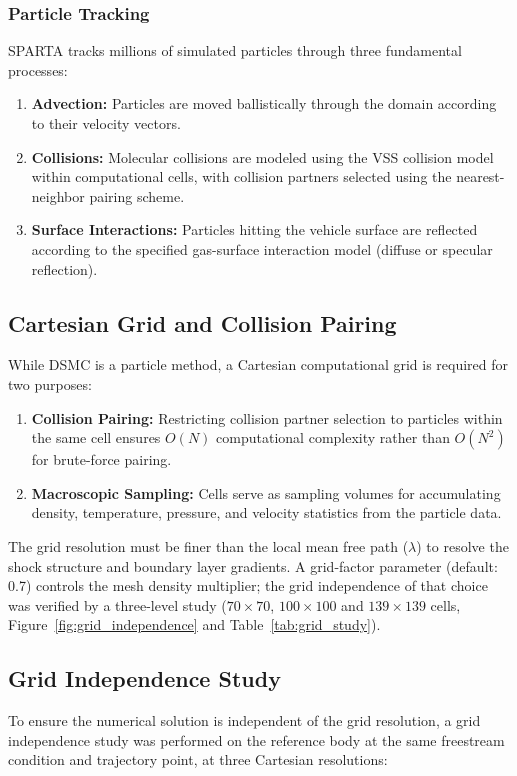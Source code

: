 \subsubsection*{Particle Tracking}
SPARTA tracks millions of simulated particles through three fundamental processes:
\begin{enumerate}
    \item \textbf{Advection:} Particles are moved ballistically through the domain according to their velocity vectors.
    \item \textbf{Collisions:} Molecular collisions are modeled using the VSS collision model within computational cells, with collision partners selected using the nearest-neighbor pairing scheme.
    \item \textbf{Surface Interactions:} Particles hitting the vehicle surface are reflected according to the specified gas-surface interaction model (diffuse or specular reflection).
\end{enumerate}

\subsection{Cartesian Grid and Collision Pairing}
While DSMC is a particle method, a Cartesian computational grid is required for two purposes:
\begin{enumerate}
    \item \textbf{Collision Pairing:} Restricting collision partner selection to particles within the same cell ensures $O(N)$ computational complexity rather than $O(N^2)$ for brute-force pairing.
    \item \textbf{Macroscopic Sampling:} Cells serve as sampling volumes for accumulating density, temperature, pressure, and velocity statistics from the particle data.
\end{enumerate}

The grid resolution must be finer than the local mean free path ($\lambda$) to resolve the shock structure and boundary layer gradients. A grid-factor parameter (default: 0.7) controls the mesh density multiplier; the grid independence of that choice was verified by a three-level study ($70\times70$, $100\times100$ and $139\times139$ cells, Figure~\ref{fig:grid_independence} and Table~\ref{tab:grid_study}).

\subsection{Grid Independence Study}
To ensure the numerical solution is independent of the grid resolution, a grid independence study was performed on the reference body at the same freestream condition and trajectory point, at three Cartesian resolutions:

